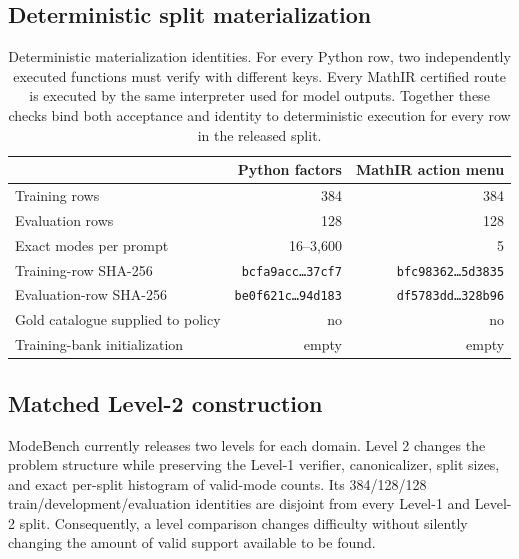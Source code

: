 \subsection{Deterministic split materialization}
\label{app:data-materialization}

\begin{table}[H]
\centering
\caption{Deterministic materialization identities. For every Python row, two
independently executed functions must verify with different keys. Every MathIR
certified route is executed by the same interpreter used for model outputs.
Together these checks bind both acceptance and identity to deterministic
execution for every row in the released split.}
\label{tab:materialization-identities}
\small
\begin{tabular}{@{}lrr@{}}
\toprule
& \textbf{Python factors} & \textbf{MathIR action menu} \\
\midrule
Training rows & 384 & 384 \\
Evaluation rows & 128 & 128 \\
Exact modes per prompt & 16--3,600 & 5 \\
Training-row SHA-256 & \texttt{bcfa9acc\ldots37cf7} & \texttt{bfc98362\ldots5d3835} \\
Evaluation-row SHA-256 & \texttt{be0f621c\ldots94d183} & \texttt{df5783dd\ldots328b96} \\
Gold catalogue supplied to policy & no & no \\
Training-bank initialization & empty & empty \\
\bottomrule
\end{tabular}
\end{table}

\subsection{Matched Level-2 construction}
\label{app:data-levels}

ModeBench currently releases two levels for each domain. Level 2 changes the
problem structure while preserving the Level-1 verifier, canonicalizer, split
sizes, and exact per-split histogram of valid-mode counts. Its 384/128/128
train/development/evaluation identities are disjoint from every Level-1 and
Level-2 split. Consequently, a level comparison changes difficulty without
silently changing the amount of valid support available to be found.

